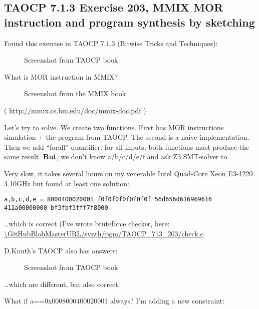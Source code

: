 \subsection{TAOCP 7.1.3 Exercise 203, MMIX MOR instruction and program synthesis by sketching}

\renewcommand{\CURPATH}{synth/pgm/TAOCP_713_203}

Found this exercise in TAOCP 7.1.3 (Bitwise Tricks and Techniques):

\begin{figure}[H]
\centering
{}
\caption{Screenshot from TAOCP book}
\end{figure}

What is MOR instruction in MMIX?

\begin{figure}[H]
\centering
{}
\caption{Screenshot from the MMIX book}
\end{figure}

( \url{http://mmix.cs.hm.edu/doc/mmix-doc.pdf} )

Let's try to solve. We create two functions. First has MOR instructions simulation + the program from TAOCP.
The second is a naive implementation.
Then we add ``forall'' quantifier: for all inputs, both functions must produce the same result.
\textbf{But}, we don't know a/b/c/d/e/f and ask Z3 SMT-solver to



Very slow, it takes several hours on my venerable Intel Quad-Core Xeon E3-1220 3.10GHz but found at least one solution:

\begin{lstlisting}
a,b,c,d,e = 8000400020001 f0f0f0f0f0f0f0f 56d656d616969616 411a00000000 bf3fbf3fff7f8000
\end{lstlisting}

\dots which is correct (I've wrote bruteforce checker, here: \url{\GitHubBlobMasterURL/\CURPATH/check.c}.

D.Knuth's TAOCP also has answers:

\begin{figure}[H]
\centering
{}
\caption{Screenshot from TAOCP book}
\end{figure}

\dots which are different, but also correct.

What if a==0x0008000400020001 always?
I'm adding a new constraint:

